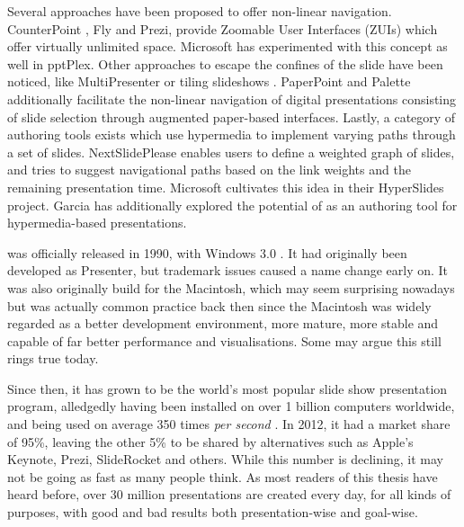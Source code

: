    Several approaches have been proposed to offer non-linear navigation.
   CounterPoint \citep{good-1}, Fly \citep{lichtschlag-1} and Prezi, provide
   Zoomable User Interfaces (ZUIs) which offer virtually unlimited space.
   Microsoft has experimented with this concept as well in pptPlex. Other
   approaches to escape the confines of the slide have been noticed, like
   MultiPresenter \citep{lanir-1} or tiling slideshows \citep{chen-1}.
   PaperPoint \citep{signer-1} and Palette \citep{nelson-2} additionally
   facilitate the non-linear navigation of digital presentations consisting of
   slide selection through augmented paper-based interfaces. Lastly, a category
   of authoring tools exists which use hypermedia to implement varying paths
   through a set of slides. NextSlidePlease \citep{spicer-1} enables users to
   define a weighted graph of slides, and tries to suggest navigational paths
   based on the link weights and the remaining presentation time. Microsoft
   cultivates this idea in their HyperSlides \citep{edge-1} project. Garcia
   \citep{garcia-1} has additionally explored the potential of \ppt* as an
   authoring tool for hypermedia-based presentations.

   \ppt* was officially released in 1990, with Windows 3.0 \citep{austin-1}. It
   had originally been developed as Presenter, but trademark issues caused a
   name change early on. It was also originally build for the Macintosh, which
   may seem surprising nowadays but was actually common practice back then
   since the Macintosh was widely regarded as a better development environment,
   more mature, more stable and capable of far better performance and
   visualisations. Some may argue this still rings true today.

   Since then, it has grown to be the world's most popular slide show
   presentation program, alledgedly having been installed on over 1 billion
   computers worldwide, and being used on average 350 times \emph{per second}
   \citep{parks-1}. In 2012, it had a market share of 95\%, leaving the other
   5\% to be shared by alternatives such as Apple's Keynote, Prezi, SlideRocket
   and others. While this number is declining, it may not be going as fast as
   many people think. As most readers of this thesis have heard before, over 30
   million \ppt presentations are created every day, for all kinds of purposes,
   with good and bad results both presentation-wise and goal-wise.

